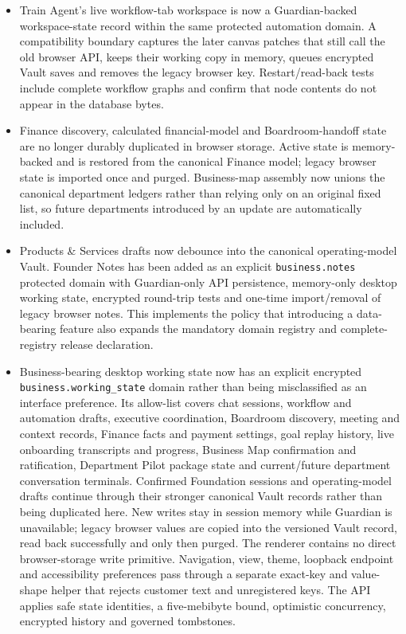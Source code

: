 \documentclass[11pt]{article}
\begin{document}
\begin{itemize}
  \item Train Agent's live workflow-tab workspace is now a Guardian-backed workspace-state record within the same protected automation domain. A compatibility boundary captures the later canvas patches that still call the old browser API, keeps their working copy in memory, queues encrypted Vault saves and removes the legacy browser key. Restart/read-back tests include complete workflow graphs and confirm that node contents do not appear in the database bytes.
  \item Finance discovery, calculated financial-model and Boardroom-handoff state are no longer durably duplicated in browser storage. Active state is memory-backed and is restored from the canonical Finance model; legacy browser state is imported once and purged. Business-map assembly now unions the canonical department ledgers rather than relying only on an original fixed list, so future departments introduced by an update are automatically included.
  \item Products \& Services drafts now debounce into the canonical operating-model Vault. Founder Notes has been added as an explicit \texttt{business.notes} protected domain with Guardian-only API persistence, memory-only desktop working state, encrypted round-trip tests and one-time import/removal of legacy browser notes. This implements the policy that introducing a data-bearing feature also expands the mandatory domain registry and complete-registry release declaration.
  \item Business-bearing desktop working state now has an explicit encrypted \texttt{business.working\_state} domain rather than being misclassified as an interface preference. Its allow-list covers chat sessions, workflow and automation drafts, executive coordination, Boardroom discovery, meeting and context records, Finance facts and payment settings, goal replay history, live onboarding transcripts and progress, Business Map confirmation and ratification, Department Pilot package state and current/future department conversation terminals. Confirmed Foundation sessions and operating-model drafts continue through their stronger canonical Vault records rather than being duplicated here. New writes stay in session memory while Guardian is unavailable; legacy browser values are copied into the versioned Vault record, read back successfully and only then purged. The renderer contains no direct browser-storage write primitive. Navigation, view, theme, loopback endpoint and accessibility preferences pass through a separate exact-key and value-shape helper that rejects customer text and unregistered keys. The API applies safe state identities, a five-mebibyte bound, optimistic concurrency, encrypted history and governed tombstones.

\end{itemize}
\end{document}
